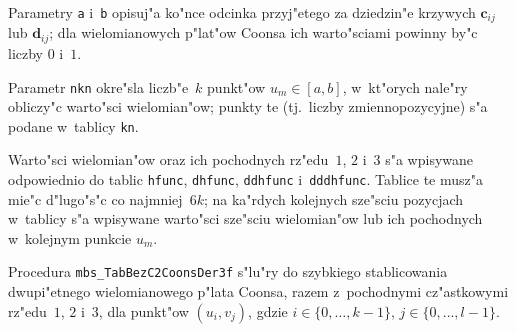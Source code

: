 Parametry \texttt{a} i~\texttt{b} opisuj"a ko"nce odcinka przyj"etego
za dziedzin"e krzywych $\bm{c}_{ij}$ lub $\bm{d}_{ij}$; dla wielomianowych
p"lat"ow Coonsa ich warto"sciami powinny by"c liczby $0$ i~$1$.

Parametr \texttt{nkn} okre"sla liczb"e~$k$ punkt"ow $u_m\in[a,b]$,
w~kt"orych nale"ry obliczy"c warto"sci wielomian"ow; punkty te (tj.\ liczby
zmiennopozycyjne) s"a podane w~tablicy \texttt{kn}.

Warto"sci wielomian"ow oraz ich pochodnych rz"edu~$1$, $2$ i~$3$ s"a wpisywane 
odpowiednio do tablic \texttt{hfunc}, \texttt{dhfunc}, \texttt{ddhfunc}
i~\texttt{dddhfunc}. Tablice te musz"a mie"c d"lugo"s"c co najmniej~$6k$;
na ka"rdych kolejnych sze"sciu pozycjach w~tablicy s"a wpisywane warto"sci
sze"sciu wielomian"ow lub ich pochodnych w~kolejnym punkcie $u_m$.

\vspace{\bigskipamount}
Procedura \texttt{mbs\_TabBezC2CoonsDer3f} s"lu"ry do szybkiego stablicowania
dwupi"etnego wielomianowego p"lata Coonsa, razem z~pochodnymi cz"astkowymi
rz"edu~$1$, $2$ i~$3$, dla punkt"ow $(u_i,v_j)$, gdzie
$i\in\{0,\ldots,k-1\}$, $j\in\{0,\ldots,l-1\}$.

